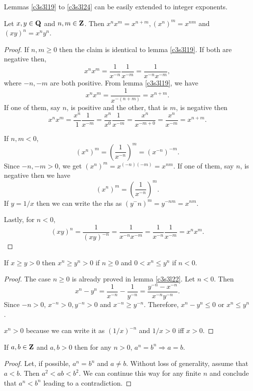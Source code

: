 Lemmas \ref{c3s3l19} to \ref{c3s3l24} can be easily extended to integer
exponents.
\begin{lem}\label{c3s3l25}
Let $x, y \in \mathbf{Q}$ and $n, m \in \mathbf{Z}$. Then $x^n x^m = x^{n + m}, 
(x^n)^m = x^{nm}$ and $(xy)^n = x^n y^n$.
\end{lem}
\begin{proof}
If $n, m \ge 0$ then the claim is identical to lemma \ref{c3s3l19}. If 
both are negative then,
\[
x^n x^m = \frac{1}{x^{-n}}\frac{1}{x^{-m}} = \frac{1}{x^{-n}x^{-m}},
\]
where $-n, -m$ are both positive. From lemma \ref{c3s3l19}, we have
\[
x^n x^m = \frac{1}{x^{-(n+m)}} = x^{n+m}.
\]
If one of them, say $n$, is positive and the other, that is $m$, is
negative then 
\[
x^n x^m = \frac{x^n}{1}\frac{1}{x^{-m}} = \frac{x^n}{x^0}\frac{1}{x^{-m}}
= \frac{x^n}{x^{-m + 0}} = \frac{x^n}{x^{-m}} = x^{n+m}.
\]

If $n, m < 0$,
\[
(x^n)^m = \left(\frac{1}{x^{-n}}\right)^m = (x^{-n})^{-m}.
\]
Since $-n, -m > 0$, we get $(x^n)^m = x^{(-n)(-m)} = x^{nm}$. If one of 
them, say $n$, is negative then we have
\[
(x^n)^m = \left(\frac{1}{x^{-n}}\right)^m.
\]
If $y = 1/x$ then we can write the rhs as $(y^-n)^m = y^{-nm} = x^{nm}$.

Lastly, for $n < 0$, 
\[
(xy)^n = \frac{1}{(xy)^{-n}} = \frac{1}{x^{-n}x^{-m}} = \frac{1}{x^{-n}}
\frac{1}{x^{-m}} = x^nx^m.
\]
\end{proof}

\begin{lem}\label{c3s3l26}
If $x \ge y > 0$ then $x^n \ge y^n > 0$ if $n \ge 0$ and $0 < x^n \le 
y^n$ if $n < 0$.
\end{lem}
\begin{proof}
The case $n \ge 0$ is already proved in lemma \ref{c3s3l22}. Let $n < 0$.
Then 
\[
x^n - y^n = \frac{1}{x^{-n}} - \frac{1}{y^{-n}} = 
\frac{y^{-n} - x^{-n}}{x^{-n}y^{-n}}.
\]
Since $-n > 0$, $x^{-n} > 0, y^{-n} > 0$ and $x^{-n} \ge y^{-n}$. 
Therefore, $x^n - y^n \le 0$ or $x^n \le y^n$.

$x^n > 0$ because we can write it as $(1/x)^{-n}$ and $1/x > 0$ iff $x > 
0$.
\end{proof}

\begin{lem}\label{c3s3l27}
If $a, b \in \mathbf{Z}$ and $a, b > 0$ then for any $n > 0$, $a^n = b^n 
\Rightarrow a = b$.
\end{lem}
\begin{proof}
Let, if possible, $a^n = b^n$ and $a \ne b$. Without loss of generality,
assume that $a < b$. Then $a^2 < ab < b^2$. We can continue this way for
any finite $n$ and conclude that $a^n < b^n$ leading to a contradiction.
\end{proof}

